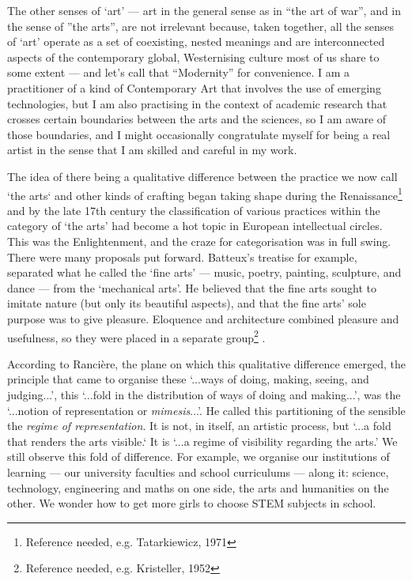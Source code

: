 \documentclass[letterpaper]{article}
\begin{document}
    The other senses of ‘art’ — art in the general sense as in “the art of war”, and in the sense of ”the arts”, are not irrelevant because, taken together, all the senses of ‘art’ operate as a set of coexisting, nested meanings and are interconnected aspects of the contemporary global, Westernising culture most of us share to some extent — and let's call that “Modernity” for convenience. I am a practitioner of a kind of Contemporary Art that involves the use of emerging technologies, but I am also practising in the context of academic research that crosses certain boundaries between the arts and the sciences, so I am aware of those boundaries, and I might occasionally congratulate myself for being a real artist in the sense that I am skilled and careful in my work.

    The idea of there being a qualitative difference between the practice we now call ‘the arts‘ and other kinds of crafting began taking shape during the Renaissance\footnote{Reference needed, e.g. Tatarkiewicz, 1971} and by the late 17th century the classification of various practices within the category of ‘the arts’ had become a hot topic in European intellectual circles. This was the Enlightenment, and the craze for categorisation was in full swing. There were many proposals put forward. Batteux’s treatise for example, separated what he called the ‘fine arts’ — music, poetry, painting, sculpture, and dance — from the ‘mechanical arts’. He believed that the fine arts sought to imitate nature (but only its beautiful aspects), and that the fine arts’ sole purpose was to give pleasure. Eloquence and architecture combined pleasure and usefulness, so they were placed in a separate group\footnote{Reference needed, e.g. Kristeller, 1952} \citep[p.632]{NadalSkovAFrwllTArt2020}.

    According to Rancière, the plane on which this qualitative difference emerged, the principle that came to organise these ‘...ways of doing, making, seeing, and judging...’, this ‘...fold in the distribution of ways of doing and making...’, was the ‘...notion of representation or \emph{mimesis}...’. He called this partitioning of the sensible the \emph{regime of representation}\citep[p.22]{RancierPltcsOfThAsthtcs2004}. It is not, in itself, an artistic process, but ‘...a fold that renders the arts visible.‘ It is  ‘...a regime of visibility regarding the arts.’ We still observe this fold of difference. For example, we organise our institutions of learning — our university faculties and school curriculums — along it: science, technology, engineering and maths on one side, the arts and humanities on the other. We wonder how to get more girls to choose STEM subjects in school.
\end{document}
